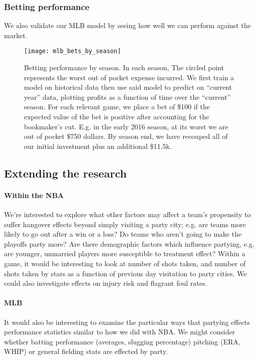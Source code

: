 \documentclass[letterpaper,12pt]{article}
\begin{document}
\subsubsection{Betting performance}
We also validate our MLB model by seeing how well we can perform against the
market.
\begin{figure}[!h]
  \centering
  \texttt{[image: mlb\_bets\_by\_season]}
  \caption{Betting performance by season. In each season, The 
    circled point represents the worst out of pocket expense incurred.
    We first train a model on historical data then use said model to predict on ``current year''
    data, plotting profits as a function of time over the ``current'' season. For each relevant
    game, we place a bet of \$100 if the expected value of the bet is positive after accounting for the bookmaker's cut. E.g. in the     early 2016 season,
    at its worst we are out of pocket \$750 dollars. By season end, we have     recouped all of
    our initial investment plus an additional \$11.5k.}
  \label{bettingperf}
\end{figure}

\clearpage

\subsection{Extending the research}
\paragraph{Within the NBA} 
We're interested to explore what other factors may affect a team's propensity to suffer hangover effects beyond simply visiting a party city; e.g. are teams more likely to go out after
a win or a loss? Do teams who aren't going to make the playoffs party more? Are there demographic
factors which influence partying, e.g. are younger, unmarried players more susceptible to treatment effect? Within a game, it would be interesting to look at 
number of shots taken, and number of shots taken by 
stars as a function of previous day visitation to party cities. We could also investigate 
effects on injury risk and flagrant foul rates.

\paragraph{MLB}
It would also be interesting to examine the particular ways that partying
effects performance statistics similar to how we did with NBA.
We might consider whether batting performance (averages, slugging percentage)
pitching (ERA, WHIP) or general fielding stats are effected by party.
\end{document}
